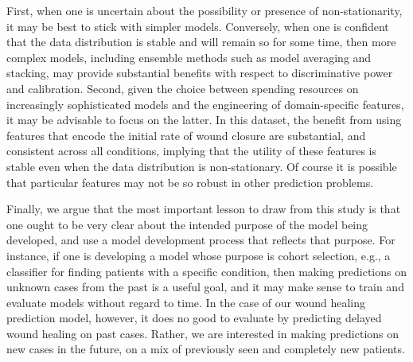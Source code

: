 First, when one is uncertain about the possibility or presence of
non-stationarity, it may be best to stick with simpler models.
Conversely, when one is confident that the data distribution is stable
and will remain so for some time, then more complex models, including
ensemble methods such as model averaging and stacking, may provide
substantial benefits with respect to discriminative power and
calibration.  Second, given the choice between spending resources on
increasingly sophisticated models and the engineering of
domain-specific features, it may be advisable to focus on the latter.
In this dataset, the benefit from using features that encode the
initial rate of wound closure are substantial, and consistent across
all conditions, implying that the utility of these features is stable
even when the data distribution is non-stationary.  Of course it is
possible that particular features may not be so robust in other
prediction problems.

Finally, we argue that the most important lesson to draw from this
study is that one ought to be very clear about the intended purpose of
the model being developed, and use a model development process that
reflects that purpose.  For instance, if one is developing a model
whose purpose is cohort selection, e.g., a classifier for finding
patients with a specific condition, then making predictions on unknown
cases from the past is a useful goal, and it may make sense to train
and evaluate models without regard to time.  In the case of our wound
healing prediction model, however, it does no good to evaluate by
predicting delayed wound healing on past cases.  Rather, we are
interested in making predictions on new cases in the future, on a mix
of previously seen and completely new patients.



